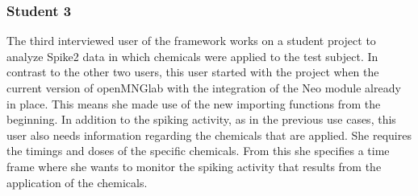 \subsubsection{Student 3}

The third interviewed user of the framework works on a student project to analyze Spike2 data in which chemicals were applied to the test subject. In contrast to the other two users, this user started with the project when the current version of openMNGlab with the integration of the Neo module already in place. This means she made use of the new importing functions from the beginning. In addition to the spiking activity, as in the previous use cases, this user also needs information regarding the chemicals that are applied. She requires the timings and doses of the specific chemicals. From this she specifies a time frame where she wants to monitor the spiking activity that results from the application of the chemicals.

